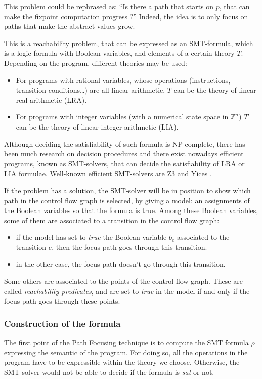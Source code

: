 \documentclass[a4paper,english,titlepage,11pt]{report}
\def\Z{\mathbb{Z}}
\begin{document}
	This problem could be rephrased as:
	``Is there a path that starts on $p$, that can make the fixpoint computation
	progress ?''
	Indeed, the idea is to only focus on paths that make the abstract values
	grow.

	This is a reachability problem, that can be expressed as an SMT-formula,
	which is a logic formula with Boolean variables, and elements of a certain
	theory $T$. Depending on the program, different theories may be used:
	\begin{itemize}
	\item For programs with rational variables, whose operations (instructions,
	transition conditions\dots) are all linear arithmetic, $T$ can be the theory
	of linear real arithmetic (LRA).
	\item For programs with integer variables (with a numerical state space in
	$\Z^n$) $T$ can be the theory of linear integer arithmetic (LIA).
	\end{itemize}

	Although deciding the satisfiability of such formula is NP-complete, there
	has been much research on decision procedures \cite{Kroening08} and there exist nowadays
	efficient programs, known as SMT-solvers, that can decide the satisfiability
	of LRA or LIA formulae. Well-known efficient SMT-solvers are
	Z3 \cite{MouraB08} and Yices \cite{DutertreM06}. 

	If the problem has a solution,  the SMT-solver will be in position to show
	which path in the control flow graph is selected, by giving a model: an
	assignments of the Boolean variables so that the formula is true.
	Among these Boolean variables, some of them are associated to a transition
	in the control flow graph:
	\begin{itemize}
	\item if the model has set to \emph{true} the Boolean variable $b_e$ associated
	to the transition $e$, then the focus path goes through this transition.
	\item in the other case, the focus path doesn't go through this transition.
	\end{itemize}
	
	Some others are associated to the points of the control flow graph. These
	are called \emph{reachability predicates}, and are set to \emph{true} in the
	model if and only if the focus path goes through these points.

	\subsubsection{Construction of the formula}
	The first point of the Path Focusing technique is to compute the SMT formula
	$\rho$ expressing the semantic of the program. For doing so, all the
	operations in the program have to be expressible within the theory we
	choose. Otherwise, the SMT-solver would not be able to decide if the formula
	is \emph{sat} or not.
\end{document}

